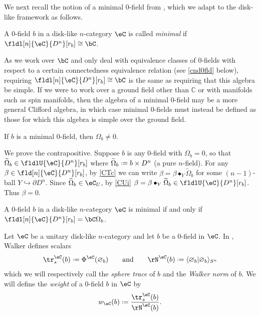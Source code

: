 \documentclass[12pt,reqno]{amsart}
\newcommand{\psn}{\Phi}
\newcommand{\C}{\eC}
\newcommand{\blt}{\bullet}
\newcommand{\tld}[1]{{\widetilde{#1}}}
\newcommand{\bkt}[2]{\langle #1|#2 \rangle}
\newcommand{\defn}[1]{\emph{#1}}
\DeclareRobustCommand{\coloneq}{\mathrel{\vcenter{\baselineskip0.5ex\lineskiplimit0pt\hbox{\scriptsize{\upshape.}}\hbox{\scriptsize{\upshape.}}}}=}
\newcommand{\lU}[1]{#1_U}
\begin{document}
We next recall the notion of a minimal 0-field from \cite{W21}, which we adapt to the disk-like framework as follows.
\begin{definition}[{\cite{W21}}]
  A 0-field $b$ in a disk-like $n$-category $\C$ is called \defn{minimal} if $\fldl[n]{\C}{D^n}[r_b]\cong\bC$.
\end{definition}

\begin{remark}
As we work over $\bC$ and only deal with equivalence classes of 0-fields with respect to a certain connectedness equivalence relation (see \cref{cnd0fld} below), requiring $\fldl[n]{\C}{D^n}[r_b]\cong\bC$ is the same as requiring that this algebra be simple. If we were to work over a ground field other than $\mathbb{C}$ or with manifolds such as spin manifolds, then the algebra of a minimal 0-field may be a more general Clifford algebra, in which case minimal 0-fields must instead be defined as those for which this algebra is simple over the ground field.
\end{remark}

\begin{lemma} 
\label{bnz}
If $b$ is a minimal 0-field, then $\Omega_b\neq0$.
\end{lemma} 

\begin{pf} 
We prove the contrapositive. Suppose $b$ is any 0-field with $\Omega_b=0$, so that $\tld\Omega_b\in\fldlU{\C}{D^n}[r_b]$ where $\tld\Omega_b\coloneq b\times D^n$ (a pure $n$-field). For any $\beta\in\fld[n]{\C}{D^n}[r_b]$, by \ref{CTc} we can write $\beta=\beta\blt_Y\tld\Omega_b$ for some $(n-1)$-ball $Y\hookrightarrow \partial D^n$. Since $\tld\Omega_b\in\lU{\C}$, by \ref{CUi} $\beta=\beta\blt_{Y}\tld\Omega_b\in\fldlU{\C}{D^n}[r_b]$. Thus $\beta=0$.
\end{pf}

\begin{corollary}
A 0-field $b$ in a disk-like $n$-category $\C$ is minimal if and only if $\fldl[n]{\C}{D^n}[r_b]=\bC\Omega_b$.
\end{corollary}

\begin{definition}
\label{def:sphere-trace-walker-norm}
Let $\C$ be a unitary disk-like $n$-category and let $b$ be a 0-field in $\C$. In \cite{W21}, Walker defines scalars
\[
\tr_s^\C(b)\coloneq\psn^\C(\varnothing_b)
\qquad\text{and}\qquad
\rN^\C(b)\coloneq\bkt{\varnothing_b}{\varnothing_b}_{S^n}
\]
which we will respectively call the \defn{sphere trace} of $b$ and the \defn{Walker norm} of $b$. We will define the \defn{weight} of a 0-field $b$ in $\C$ by
\[
  w_\C(b)\coloneq\frac{\tr_s^\C(b)}{\rN^\C(b)}.
\]
\end{definition}
\end{document}
